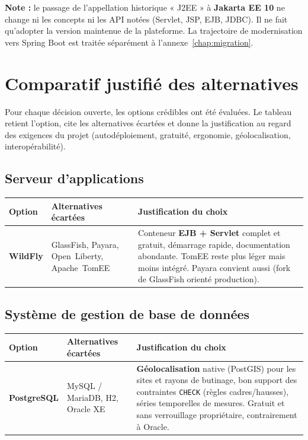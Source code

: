 \begin{encadre}
\textbf{Note :} le passage de l'appellation historique « J2EE » à
\textbf{Jakarta EE 10} ne change ni les concepts ni les API notées (Servlet,
JSP, EJB, JDBC). Il ne fait qu'adopter la version maintenue de la plateforme.
La trajectoire de modernisation vers Spring Boot est traitée séparément à
l'annexe~\ref{chap:migration}.
\end{encadre}

\section{Comparatif justifié des alternatives}
Pour chaque décision ouverte, les options crédibles ont été évaluées. Le tableau
retient l'option, cite les alternatives écartées et donne la justification au
regard des exigences du projet (autodéploiement, gratuité, ergonomie,
géolocalisation, interopérabilité).

\subsection{Serveur d'applications}
\begin{xltabular}{\textwidth}{>{\bfseries}p{2.7cm} p{4.2cm} X}
\toprule
\textbf{Option} & \textbf{Alternatives écartées} & \textbf{Justification du choix} \\
\midrule
\endhead
WildFly & GlassFish, Payara, Open~Liberty, Apache~TomEE & Conteneur \textbf{EJB + Servlet} complet et gratuit, démarrage rapide, documentation abondante. TomEE reste plus léger mais moins intégré. Payara convient aussi (fork de GlassFish orienté production). \\
\bottomrule
\end{xltabular}

\subsection{Système de gestion de base de données}
\begin{xltabular}{\textwidth}{>{\bfseries}p{2.7cm} p{4.2cm} X}
\toprule
\textbf{Option} & \textbf{Alternatives écartées} & \textbf{Justification du choix} \\
\midrule
\endhead
PostgreSQL & MySQL / MariaDB, H2, Oracle XE & \textbf{Géolocalisation} native (PostGIS) pour les sites et rayons de butinage, bon support des contraintes \texttt{CHECK} (règles cadres/hausses), séries temporelles de mesures. Gratuit et sans verrouillage propriétaire, contrairement à Oracle. \\
\bottomrule
\end{xltabular}

